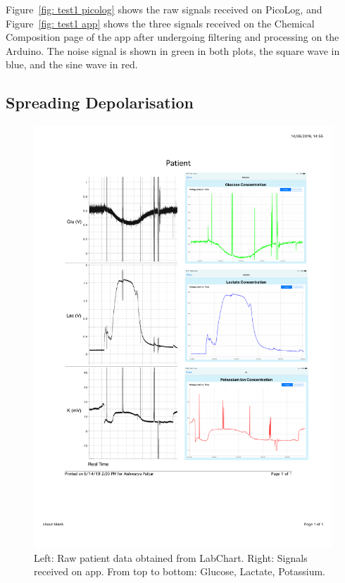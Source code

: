 Figure~\ref{fig: test1 picolog} shows the raw signals received on PicoLog, and Figure~\ref{fig: test1 app} shows the three signals received on the Chemical Composition page of the app after undergoing filtering and processing on the Arduino. The noise signal is shown in green in both plots, the square wave in blue, and the sine wave in red.


\subsection{Spreading Depolarisation}

\begin{figure}[h!]
\centering
\includegraphics[trim={1.25cm 6cm 1.5cm  3cm}, clip, width=1\textwidth]{./figures/test2.pdf}
\captionsetup{justification=centering}
\caption{Left: Raw patient data obtained from LabChart. Right: Signals received on app. From top to bottom: Glucose, Lactate, Potassium.}
\label{fig: test2}
\end{figure}

